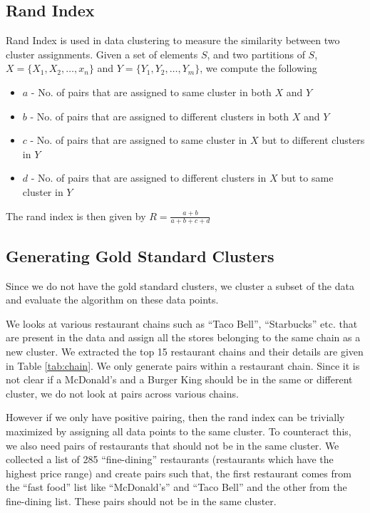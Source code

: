 \documentclass{article}
\begin{document}
\subsection{Rand Index}
Rand Index is used in data clustering to measure the similarity between two cluster assignments.
Given a set of elements $S$, and two partitions of $S$, $X = \{ X_1, X_2, \ldots, x_n \}$ and $Y = \{Y_1, Y_2, \ldots, Y_m\}$, we compute the following
\begin{itemize}
\item $a$ - No. of pairs that are assigned to same cluster in both $X$ and $Y$
\item $b$ - No. of pairs that are assigned to different clusters in both $X$ and $Y$
\item $c$ - No. of pairs that are assigned to same cluster in $X$ but to different clusters in $Y$
\item $d$ - No. of pairs that are assigned to different clusters in $X$ but to same cluster in $Y$
\end{itemize}

The rand index is then given by
$R = \frac{a+b}{a+b+c+d}$

\subsection{Generating Gold Standard Clusters}
Since we do not have the gold standard clusters, we cluster a subset of the data and evaluate the algorithm on these data points.

We looks at various restaurant chains such as ``Taco Bell'', ``Starbucks'' etc. that are present in the data and assign all the stores belonging to the same chain as a new cluster.
We extracted the top 15 restaurant chains and their details are given in Table {\ref{tab:chain}}.
We only generate pairs within a restaurant chain.
Since it is not clear if a McDonald's and a Burger King should be in the same or different cluster, we do not look at pairs across various chains.

However if we only have positive pairing, then the rand index can be trivially maximized by assigning all data points to the same cluster.
To counteract this, we also need pairs of restaurants that should not be in the same cluster.
We collected a list of 285 ``fine-dining'' restaurants (restaurants which have the highest price range) and create pairs such that,
the first restaurant comes from the ``fast food'' list like ``McDonald's'' and ``Taco Bell'' and the other from the fine-dining list.
These pairs should not be in the same cluster.
\end{document}
